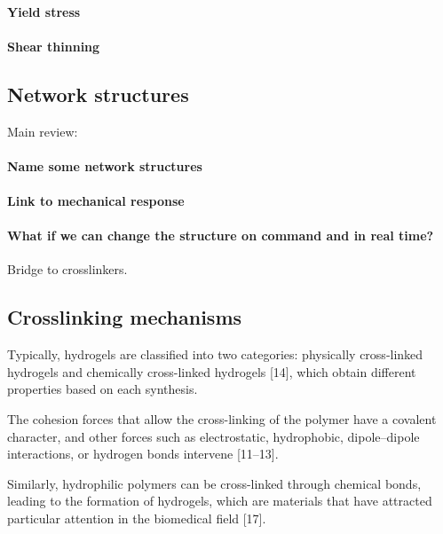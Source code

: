 \paragraph{Yield stress}

\paragraph{Shear thinning}

\subsection{Network structures}\label{ch1:NetworkStructure}

Main review:\citep{guPolymerNetworksPlastics2020,sheikoArchitecturalCodeRubber2019}

\paragraph{Name some network structures}

\paragraph{Link to mechanical response}

\paragraph{What if we can change the structure on command and in real time?} Bridge to crosslinkers.

\subsection{Crosslinking mechanisms}\label{ch1:Cross-linking}


Typically, hydrogels are classified into two categories: physically cross-linked hydrogels and chemically cross-linked hydrogels [14], which obtain different properties based on each synthesis\citep{bustamante-torresHydrogelsClassificationAccording2021}.

The cohesion forces that allow the cross-linking of the polymer have a covalent character, and other forces such as electrostatic, hydrophobic, dipole–dipole interactions, or hydrogen bonds intervene [11–13]\citep{bustamante-torresHydrogelsClassificationAccording2021}. 


Similarly, hydrophilic polymers can be cross-linked through chemical bonds, leading to the formation of hydrogels, which are materials that have attracted particular attention in the biomedical field [17]\citep{bustamante-torresHydrogelsClassificationAccording2021}. 




